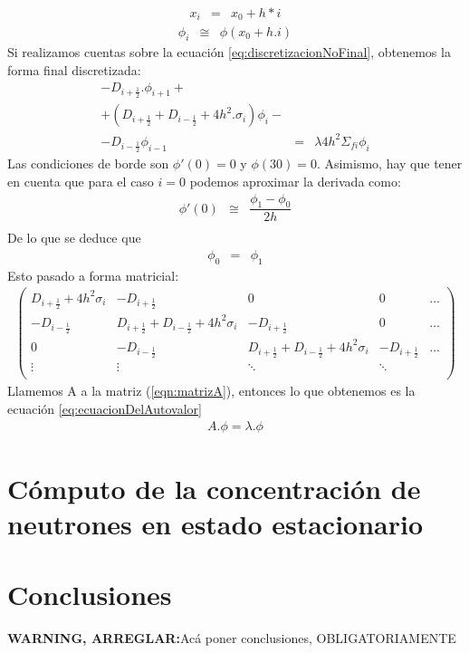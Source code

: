 \documentclass[11pt,a4paper]{emulateapj}
\def \warn {{\sffamily\bfseries\large WARNING, ARREGLAR:}}
\begin{document}
\begin{eqnarray}
	x_i &=&x_0 + h*i
\end{eqnarray}
\begin{eqnarray}
	\phi_i &\cong&\phi(x_0 + h.i)
\end{eqnarray}
Si realizamos cuentas sobre la ecuación \ref{eq:discretizacionNoFinal}, obtenemos la forma final discretizada:
\begin{eqnarray}
	-D_{i+\frac{1}{2}}.\phi_{i+1} + \\
	+(D_{i+\frac{1}{2}} + D_{i-\frac{1}{2}} + 4h^2.\sigma_i)\phi_{i} - \\
	-D_{i-\frac{1}{2}}\phi_{i-1} &=& \lambda 4h^2 \Sigma_{fi} \phi_i
\end{eqnarray}
Las condiciones de borde son $\phi'(0) = 0$ y $\phi(30) = 0$. Asimismo, hay que tener en cuenta que para el caso $i = 0$ podemos aproximar la derivada como:
\begin{eqnarray}
	\phi'(0) &\cong & \dfrac{\phi_1 - \phi_0}{2h} \\
\end{eqnarray}
De lo que se deduce que
\begin{eqnarray}
	\phi_0 &=&\phi_1
\end{eqnarray}
Esto pasado a forma matricial:
\begin{eqnarray}
\label{eqn:matrizA}
	 \left( \begin{array}{ccccc}
		D_{i+\frac{1}{2}} + 4h^2\sigma_i & -D_{i+\frac{1}{2}}  					& 0 		& 0 & \dots \\
		-D_{i-\frac{1}{2}} 		& D_{i+\frac{1}{2}} + D_{i-\frac{1}{2}} + 4h^2\sigma_i 	& -D_{i+\frac{1}{2}} & 0 & \dots \\
		0 & -D_{i-\frac{1}{2}}& D_{i+\frac{1}{2}} + D_{i-\frac{1}{2}} + 4h^2\sigma_i & -D_{i+\frac{1}{2}}  & \dots\\
		\vdots &\vdots&\ddots&\ddots&\\
		\end{array} 
	\right)
\end{eqnarray}
Llamemos A a la matriz (\ref{eqn:matrizA}), entonces lo que obtenemos es la ecuación \ref{eq:ecuacionDelAutovalor}
\begin{eqnarray}
\label{eq:ecuacionDelAutovalor}
A . \phi = \lambda . \phi
\end{eqnarray}



\section{Cómputo de la concentración de neutrones en estado estacionario}
\label{sec:computo}

\section{Conclusiones}
\label{sec:conclusiones}
\warn Acá poner conclusiones, OBLIGATORIAMENTE
%
%

\end{document}
